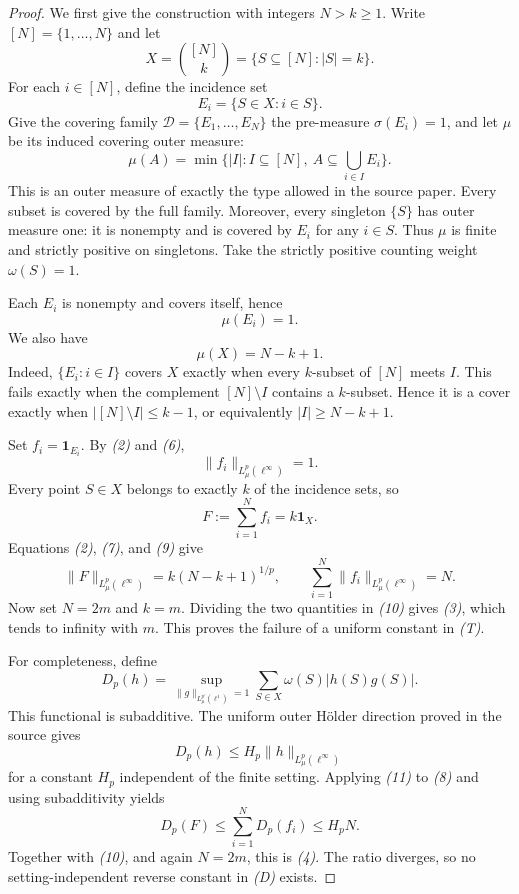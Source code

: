\documentclass[10pt]{article}
\newcommand{\1}{\mathbf 1}
\newcommand{\cD}{\mathcal D}
\newcommand{\Lpinf}{L^p_\mu(\ell^\infty)}
\begin{document}
\begin{proof}
We first give the construction with integers $N>k\ge1$. Write
$[N]=\{1,\dots,N\}$ and let
\[
 X=\binom{[N]}k=\{S\subseteq[N]:|S|=k\}.
\]
For each $i\in[N]$, define the incidence set
\[
 E_i=\{S\in X:i\in S\}.
\]
Give the covering family $\cD=\{E_1,\dots,E_N\}$ the pre-measure
$\sigma(E_i)=1$, and let $\mu$ be its induced covering outer measure:
\[
 \mu(A)=\min\bigl\{|I|:I\subseteq[N],\ 
                   A\subseteq\bigcup_{i\in I}E_i\bigr\}.
 \tag{5}
\]
This is an outer measure of exactly the type allowed in the source paper.
Every subset is covered by the full family. Moreover, every singleton
$\{S\}$ has outer measure one: it is nonempty and is covered by $E_i$ for
any $i\in S$. Thus $\mu$ is finite and strictly positive on singletons. Take
the strictly positive counting weight $\omega(S)=1$.

Each $E_i$ is nonempty and covers itself, hence
\[
                         \mu(E_i)=1.                            \tag{6}
\]
We also have
\[
                         \mu(X)=N-k+1.                          \tag{7}
\]
Indeed, $\{E_i:i\in I\}$ covers $X$ exactly when every $k$-subset of
$[N]$ meets $I$. This fails exactly when the complement $[N]\setminus I$
contains a $k$-subset. Hence it is a cover exactly when
$|[N]\setminus I|\le k-1$, or equivalently $|I|\ge N-k+1$.

Set $f_i=\1_{E_i}$. By \emph{(2)} and \emph{(6)},
\[
                         \|f_i\|_{\Lpinf}=1.                   \tag{8}
\]
Every point $S\in X$ belongs to exactly $k$ of the incidence sets, so
\[
                 F:=\sum_{i=1}^N f_i=k\1_X.                   \tag{9}
\]
Equations \emph{(2)}, \emph{(7)}, and \emph{(9)} give
\[
 \|F\|_{\Lpinf}=k(N-k+1)^{1/p},\qquad
 \sum_{i=1}^N\|f_i\|_{\Lpinf}=N.                             \tag{10}
\]
Now set $N=2m$ and $k=m$. Dividing the two quantities in \emph{(10)} gives
\emph{(3)}, which tends to infinity with $m$. This proves the failure of a
uniform constant in \emph{(T)}.

For completeness, define
\[
 D_p(h)=\sup_{\|g\|_{L^{p'}_\mu(\ell^1)}=1}
               \sum_{S\in X}\omega(S)|h(S)g(S)|.
\]
This functional is subadditive. The uniform outer H\"older direction proved
in the source gives
\[
                    D_p(h)\le H_p\|h\|_{\Lpinf}                \tag{11}
\]
for a constant $H_p$ independent of the finite setting. Applying
\emph{(11)} to \emph{(8)} and using subadditivity yields
\[
                       D_p(F)\le\sum_{i=1}^N D_p(f_i)\le H_pN.
\]
Together with \emph{(10)}, and again $N=2m$, this is \emph{(4)}. The ratio
diverges, so no setting-independent reverse constant in \emph{(D)} exists.
\end{proof}
\end{document}
